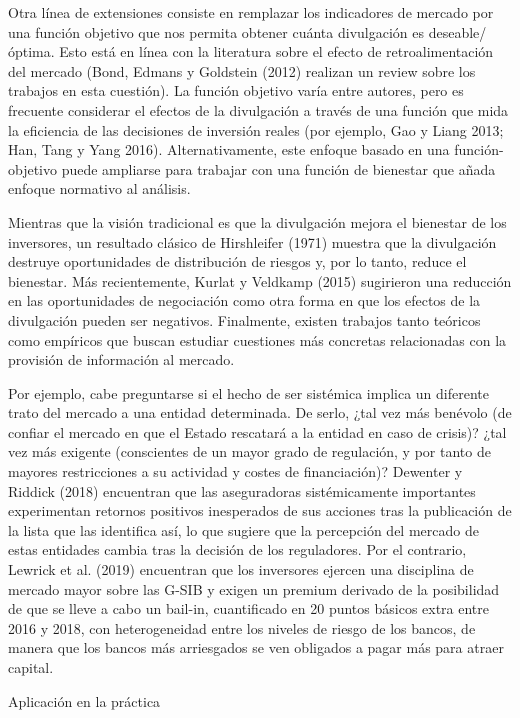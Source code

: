 \documentclass[10pt,a4paper]{article}
\begin{document}
Otra línea de extensiones consiste en remplazar los indicadores de mercado por una función objetivo que nos permita obtener cuánta divulgación es deseable/óptima. Esto está en línea con la literatura sobre el efecto de retroalimentación del mercado (Bond, Edmans y Goldstein (2012) realizan un review sobre los trabajos en esta cuestión). La función objetivo varía entre autores, pero es frecuente considerar el efectos de la divulgación a través de una función que mida la eficiencia de las decisiones de inversión reales (por ejemplo, Gao y Liang 2013; Han, Tang y Yang 2016). Alternativamente, este enfoque basado en una función-objetivo puede ampliarse para trabajar con una función de bienestar que añada enfoque normativo al análisis. 

Mientras que la visión tradicional es que la divulgación mejora el bienestar de los inversores, un resultado clásico de Hirshleifer (1971) muestra que la divulgación destruye oportunidades de distribución de riesgos y, por lo tanto, reduce el bienestar. Más recientemente, Kurlat y Veldkamp (2015) sugirieron una reducción en las oportunidades de negociación como otra forma en que los efectos de la divulgación pueden ser negativos. Finalmente, existen trabajos tanto teóricos como empíricos que buscan estudiar cuestiones más concretas relacionadas con la provisión de información al mercado. 

Por ejemplo, cabe preguntarse si el hecho de ser sistémica implica un diferente trato del mercado a una entidad determinada. De serlo, ¿tal vez más benévolo (de confiar el mercado en que el Estado rescatará a la entidad en caso de crisis)? ¿tal vez más exigente (conscientes de un mayor grado de regulación, y por tanto de mayores restricciones a su actividad y costes de financiación)? Dewenter y Riddick (2018) encuentran que las aseguradoras sistémicamente importantes experimentan retornos positivos inesperados de sus acciones tras la publicación de la lista que las identifica así, lo que sugiere que la percepción del mercado de estas entidades cambia tras la decisión de los reguladores. Por el contrario, Lewrick et al. (2019) encuentran que los inversores ejercen una disciplina de mercado mayor sobre las G-SIB y exigen un premium derivado de la posibilidad de que se lleve a cabo un bail-in, cuantificado en 20 puntos básicos extra entre 2016 y 2018, con heterogeneidad entre los niveles de riesgo de los bancos, de manera que los bancos más arriesgados se ven obligados a pagar más para atraer capital.

Aplicación en la práctica
\end{document}
